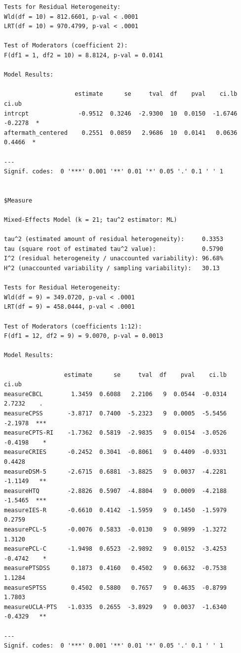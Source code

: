 \documentclass[
  letterpaper,
  DIV=11,
  numbers=noendperiod]{scrartcl}
\begin{document}
\begin{verbatim}
Tests for Residual Heterogeneity:
Wld(df = 10) = 812.6601, p-val < .0001
LRT(df = 10) = 970.4799, p-val < .0001

Test of Moderators (coefficient 2):
F(df1 = 1, df2 = 10) = 8.8124, p-val = 0.0141

Model Results:

                    estimate      se     tval  df    pval    ci.lb    ci.ub    
intrcpt              -0.9512  0.3246  -2.9300  10  0.0150  -1.6746  -0.2278  * 
aftermath_centered    0.2551  0.0859   2.9686  10  0.0141   0.0636   0.4466  * 

---
Signif. codes:  0 '***' 0.001 '**' 0.01 '*' 0.05 '.' 0.1 ' ' 1


$Measure

Mixed-Effects Model (k = 21; tau^2 estimator: ML)

tau^2 (estimated amount of residual heterogeneity):     0.3353
tau (square root of estimated tau^2 value):             0.5790
I^2 (residual heterogeneity / unaccounted variability): 96.68%
H^2 (unaccounted variability / sampling variability):   30.13

Tests for Residual Heterogeneity:
Wld(df = 9) = 349.0720, p-val < .0001
LRT(df = 9) = 458.0444, p-val < .0001

Test of Moderators (coefficients 1:12):
F(df1 = 12, df2 = 9) = 9.0070, p-val = 0.0013

Model Results:

                 estimate      se     tval  df    pval    ci.lb    ci.ub      
measureCBCL        1.3459  0.6088   2.2106   9  0.0544  -0.0314   2.7232    . 
measureCPSS       -3.8717  0.7400  -5.2323   9  0.0005  -5.5456  -2.1978  *** 
measureCPTS-RI    -1.7362  0.5819  -2.9835   9  0.0154  -3.0526  -0.4198    * 
measureCRIES      -0.2452  0.3041  -0.8061   9  0.4409  -0.9331   0.4428      
measureDSM-5      -2.6715  0.6881  -3.8825   9  0.0037  -4.2281  -1.1149   ** 
measureHTQ        -2.8826  0.5907  -4.8804   9  0.0009  -4.2188  -1.5465  *** 
measureIES-R      -0.6610  0.4142  -1.5959   9  0.1450  -1.5979   0.2759      
measurePCL-5      -0.0076  0.5833  -0.0130   9  0.9899  -1.3272   1.3120      
measurePCL-C      -1.9498  0.6523  -2.9892   9  0.0152  -3.4253  -0.4742    * 
measurePTSDSS      0.1873  0.4160   0.4502   9  0.6632  -0.7538   1.1284      
measureSPTSS       0.4502  0.5880   0.7657   9  0.4635  -0.8799   1.7803      
measureUCLA-PTS   -1.0335  0.2655  -3.8929   9  0.0037  -1.6340  -0.4329   ** 

---
Signif. codes:  0 '***' 0.001 '**' 0.01 '*' 0.05 '.' 0.1 ' ' 1



\end{verbatim}
\end{document}
